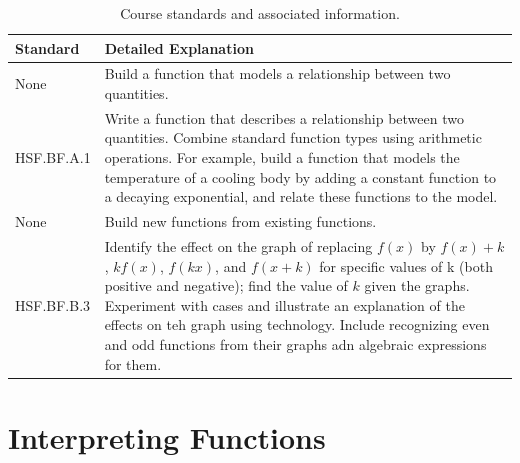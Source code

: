 \documentclass[12pt, oneside]{book}
\begin{document}
\begin{table}[h]
    \centering
    \caption{Course standards and associated information.}
    \vspace{0.3cm} %
    \begin{tabularx}{\textwidth}{l X} %
        \toprule
        \textbf{Standard} & \textbf{Detailed Explanation} \\
        \midrule
        None & Build a function that models a relationship between two quantities. \\
        HSF.BF.A.1 & Write a function that describes a relationship between two quantities. Combine standard function types using arithmetic operations. For example, build a function that models the temperature of a cooling body by adding a constant function to a decaying exponential, and relate these functions to the model. \\
        None & Build new functions from existing functions. \\
        HSF.BF.B.3 & Identify the effect on the graph of replacing $f(x)$ by $f(x)+k$, $kf(x)$, $f(kx)$, and $f(x+k)$ for specific values of k (both positive and negative); find the value of $k$ given the graphs. Experiment with cases and illustrate an explanation of the effects on teh graph using technology. Include recognizing even and odd functions from their graphs adn algebraic expressions for them. \\
        \bottomrule
    \end{tabularx}
\end{table}

\chapter{Interpreting Functions}
\end{document}
